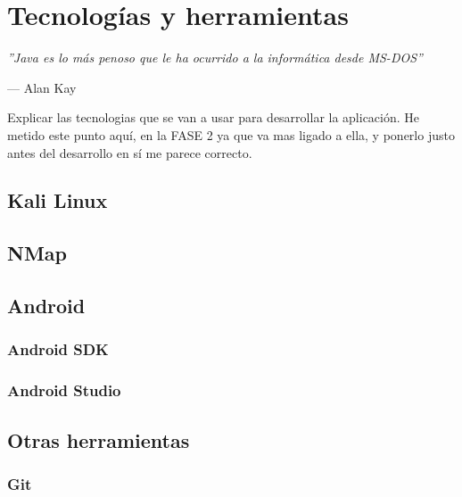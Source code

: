 \chapter{Tecnologías y herramientas}

\epigraph{\textit{''Java es lo más penoso que le ha ocurrido a la informática desde MS-DOS''}}{--- Alan Kay}

{\color{red} Explicar las tecnologias que se van a usar para desarrollar la aplicación. He metido este punto aquí, en la FASE 2 ya que va mas ligado a ella, y ponerlo justo antes del desarrollo en sí me parece correcto.}

\section{Kali Linux}


\section{NMap}


\section{Android}

\subsection{Android SDK}

\subsection{Android Studio}


\section{Otras herramientas}

\subsection{Git}